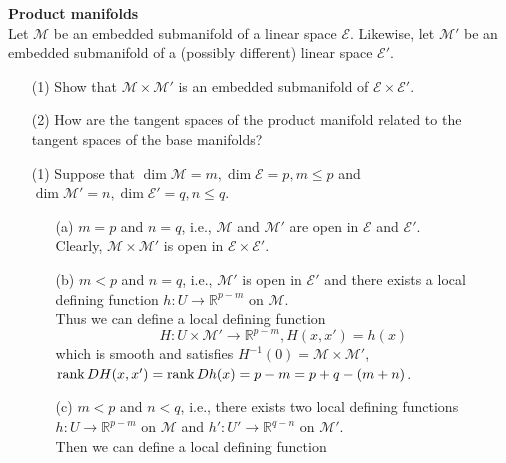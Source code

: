 \documentclass[en, oneside]{assignment}
\begin{document}
\begin{prob} \textbf{Product manifolds}\\
    Let $\mathcal{M}$ be an embedded submanifold of a linear space $\mathcal{E}$. Likewise, let $\mathcal{M}'$ be an embedded submanifold of a (possibly different) linear space $\mathcal{E}'$.
    \begin{itemize}
        \item[(1)] Show that $\mathcal{M} \times \mathcal{M}'$ is an embedded submanifold of $\mathcal{E} \times \mathcal{E}'$.
        \item[(2)] How are the tangent spaces of the product manifold related to the tangent spaces of the base manifolds?
    \end{itemize}
\end{prob}

\begin{sol}
    \begin{itemize}
        \item[(1)] Suppose that $\dim{\mathcal{M}} = m, \dim{\mathcal{E}} = p, m \leq p$ and $\dim{\mathcal{M}'} = n, \dim{\mathcal{E}'} = q, n \leq q$.
        \begin{itemize}
            \item[(a)] $m = p$ and $n = q$, i.e., $\mathcal{M}$ and $\mathcal{M}'$ are open in $\mathcal{E}$ and $\mathcal{E}'$.\\
            Clearly, $\mathcal{M} \times \mathcal{M}'$ is open in $\mathcal{E} \times \mathcal{E}'$.
            \item[(b)] $m < p$ and $n = q$, i.e., $\mathcal{M}'$ is open in $\mathcal{E}'$ 
            and there exists a local defining function $h: U \to \mathbb{R}^{p-m}$ on $\mathcal{M}$.\\
            Thus we can define a local defining function
            \begin{equation*}
                H: U \times \mathcal{M}' \to \mathbb{R}^{p-m}, H(x, x') = h(x)
            \end{equation*}
            which is smooth and satisfies $H^{-1}(0) = \mathcal{M} \times \mathcal{M}'$, $\operatorname{rank}{DH(x, x')} = \operatorname{rank}{Dh(x)} = p - m = p + q - (m + n)$.
            \item[(c)] $m < p$ and $n < q$, i.e., there exists two local defining functions $h: U \to \mathbb{R}^{p-m}$ on $\mathcal{M}$ and $h': U' \to \mathbb{R}^{q-n}$ on $\mathcal{M}'$.\\
            Then we can define a local defining function
            \begin{equation*}

\end{equation*}
\end{itemize}
\end{itemize}
\end{sol}
\end{document}
